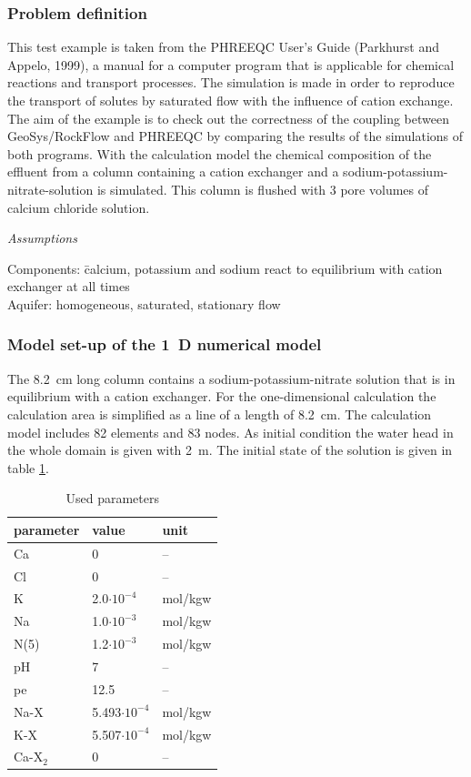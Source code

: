 \subsubsection*{Problem definition}

This test example is taken from the PHREEQC User's Guide (Parkhurst and Appelo, 1999), a manual for a computer program that is applicable for chemical reactions and transport processes. The simulation is made in order to reproduce the transport of solutes by saturated flow with the influence of cation exchange. The aim of the example is to check out the correctness of the coupling between GeoSys/RockFlow and PHREEQC by comparing the results of the simulations of both programs. With the calculation model the chemical composition of the effluent from a column containing a cation exchanger and a sodium-potassium-nitrate-solution is simulated. This column is flushed with 3 pore volumes of calcium chloride solution.

\textsl{Assumptions}

\begin{tabbing}
Components: \= calcium, potassium and sodium react to equilibrium with cation \\ \>exchanger at all times \\
Aquifer: \> homogeneous, saturated, stationary flow \\
\end{tabbing}

\subsubsection*{Model set-up of the 1~D numerical model}

The 8.2~cm long column contains a sodium-potassium-nitrate solution that is in equilibrium with a cation exchanger. For the one-dimensional calculation the calculation area is simplified as a line of a length of 8.2~cm. The calculation model includes 82 elements and 83 nodes. As initial condition the water head in the whole domain is given with 2~m. The initial state of the solution is given in table \ref{tab56}.

\begin{table}[htbp]
\centering
\begin{tabular}{|l|l|l|}
\hline
parameter & value & unit \\
\hline
Ca & 0 & -- \\
\hline
Cl & 0 & -- \\
\hline
K & 2.0$\cdot 10^{-4}$ & mol/kgw \\
\hline
Na & 1.0$\cdot 10^{-3}$ & mol/kgw \\
\hline
N(5) & 1.2$\cdot 10^{-3}$ & mol/kgw \\
\hline
pH & 7 & -- \\
\hline
pe & 12.5 & -- \\
\hline
Na-X & 5.493$\cdot 10^{-4}$ & mol/kgw \\
\hline
K-X & 5.507$\cdot 10^{-4}$ & mol/kgw \\
\hline
Ca-X$_2$ & 0 & -- \\
\hline
\end{tabular}
\caption{Used parameters}
\label{tab56}
\end{table}


